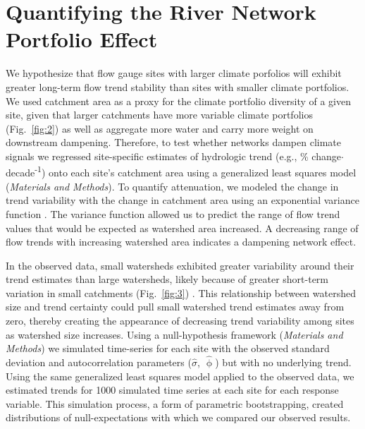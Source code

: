 \documentclass[9pt,twocolumn,twoside,lineno]{pnas-new}
\begin{document}
\section*{Quantifying the River Network Portfolio Effect}
We hypothesize that flow gauge sites with larger climate porfolios will exhibit greater long-term flow trend stability than sites with smaller climate portfolios. We used catchment area as a proxy for the climate portfolio diversity of a given site, given that larger catchments have more variable climate portfolios (Fig.~\ref{fig:2}) as well as aggregate more water and carry more weight on downstream dampening. Therefore, to test whether networks dampen climate signals we regressed site-specific estimates of hydrologic trend (e.g., \% change$\cdot$decade\textsuperscript{-1}) onto each site's catchment area using a generalized least squares model (\textit{Materials and Methods}). To quantify attenuation, we modeled the change in trend variability with the change in catchment area using an exponential variance function \cite{Pinheiro:2000}. The variance function allowed us to predict the range of flow trend values that would be expected as watershed area increased. A decreasing range of flow trends with increasing watershed area indicates a dampening network effect.

In the observed data, small watersheds exhibited greater variability around their trend estimates than large watersheds, likely because of greater short-term variation in small catchments (Fig.~\ref{fig:3}) \cite{Moore:2015}. This relationship between watershed size and trend certainty could pull small watershed trend estimates away from zero, thereby creating the appearance of decreasing trend variability among sites as watershed size increases. Using a null-hypothesis framework (\textit{Materials and Methods}) we simulated time-series for each site with the observed standard deviation and autocorrelation parameters ($\hat{\sigma}$, $\hat{\upphi}$) but with no underlying trend. Using the same generalized least squares model applied to the observed data, we estimated trends for 1000 simulated time series at each site for each response variable. This simulation process, a form of parametric bootstrapping, created distributions of null-expectations with which we compared our observed results.
\end{document}
